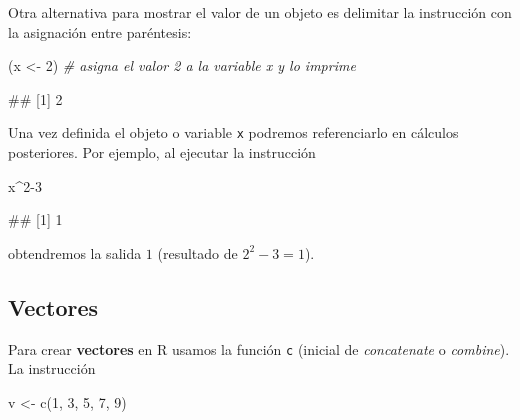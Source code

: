 \documentclass[
  title=normal,
  notoc,
  bib=normal]{mnye}
\newenvironment{Shaded}{\begin{snugshade}}{\end{snugshade}}
\newcommand{\CommentTok}[1]{\textcolor[rgb]{0.56,0.35,0.01}{\textit{#1}}}
\newcommand{\DecValTok}[1]{\textcolor[rgb]{0.00,0.00,0.81}{#1}}
\newcommand{\FunctionTok}[1]{\textcolor[rgb]{0.00,0.00,0.00}{#1}}
\newcommand{\NormalTok}[1]{#1}
\newcommand{\OtherTok}[1]{\textcolor[rgb]{0.56,0.35,0.01}{#1}}
\newcommand{\SpecialCharTok}[1]{\textcolor[rgb]{0.00,0.00,0.00}{#1}}
\begin{document}
\begin{infobox}

Otra alternativa para mostrar el valor de un objeto es delimitar la instrucción con la asignación entre paréntesis:

\begin{Shaded}
\begin{Highlighting}[]
\NormalTok{(x }\OtherTok{\textless{}{-}} \DecValTok{2}\NormalTok{) }\CommentTok{\# asigna el valor 2 a la variable x y lo imprime}
\end{Highlighting}
\end{Shaded}

\begin{Shaded}
\begin{Highlighting}[]
\NormalTok{\#\# [1] 2}
\end{Highlighting}
\end{Shaded}

\end{infobox}

Una vez definida el objeto o variable \texttt{x} podremos referenciarlo en cálculos posteriores. Por ejemplo, al ejecutar la instrucción

\begin{Shaded}
\begin{Highlighting}[]
\NormalTok{x}\SpecialCharTok{\^{}}\DecValTok{2{-}3}
\end{Highlighting}
\end{Shaded}

\begin{Shaded}
\begin{Highlighting}[]
\NormalTok{\#\# [1] 1}
\end{Highlighting}
\end{Shaded}

obtendremos la salida \(1\) (resultado de \(2^2-3 = 1\)).

\hypertarget{vectores}{%
\subsection{Vectores}\label{vectores}}

Para crear \textbf{vectores} en \textsf{R} usamos la función \texttt{c} (inicial de \emph{concatenate} o \emph{combine}). La instrucción

\begin{Shaded}
\begin{Highlighting}[]
\NormalTok{v }\OtherTok{\textless{}{-}} \FunctionTok{c}\NormalTok{(}\DecValTok{1}\NormalTok{, }\DecValTok{3}\NormalTok{, }\DecValTok{5}\NormalTok{, }\DecValTok{7}\NormalTok{, }\DecValTok{9}\NormalTok{)}
\end{Highlighting}
\end{Shaded}
\end{document}
